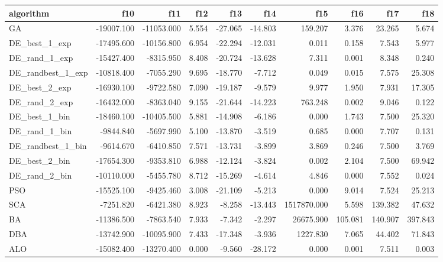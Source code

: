 \documentclass[12pt]{article}
\begin{document}
\begin{table}[H]
\begin{adjustbox}{width=1\textwidth}
    \end{adjustbox}
    
    \begin{adjustbox}{width=1\textwidth}
\begin{tabular}{lrrrrrrrrr}
    \toprule
    algorithm &        f10 &        f11 &   f12 &     f13 &     f14 &         f15 &     f16 &     f17 &     f18 \\
    \midrule
    GA & -19007.100 & -11053.000 & 5.554 & -27.065 & -14.803 &     159.207 &   3.376 &  23.265 &   5.674 \\
    DE\_best\_1\_exp & -17495.600 & -10156.800 & 6.954 & -22.294 & -12.031 &       0.011 &   0.158 &   7.543 &   5.977 \\
    DE\_rand\_1\_exp & -15427.400 &  -8315.950 & 8.408 & -20.724 & -13.628 &       7.311 &   0.001 &   8.348 &   0.240 \\
    DE\_randbest\_1\_exp & -10818.400 &  -7055.290 & 9.695 & -18.770 &  -7.712 &       0.049 &   0.015 &   7.575 &  25.308 \\
    DE\_best\_2\_exp & -16930.100 &  -9722.580 & 7.090 & -19.187 &  -9.579 &       9.977 &   1.950 &   7.931 &  17.305 \\
    DE\_rand\_2\_exp & -16432.000 &  -8363.040 & 9.155 & -21.644 & -14.223 &     763.248 &   0.002 &   9.046 &   0.122 \\
    DE\_best\_1\_bin & -18460.100 & -10405.500 & 5.881 & -14.908 &  -6.186 &       0.000 &   1.743 &   7.500 &  25.320 \\
    DE\_rand\_1\_bin &  -9844.840 &  -5697.990 & 5.100 & -13.870 &  -3.519 &       0.685 &   0.000 &   7.707 &   0.131 \\
    DE\_randbest\_1\_bin &  -9614.670 &  -6410.850 & 7.571 & -13.731 &  -3.899 &       3.869 &   0.246 &   7.500 &   3.769 \\
    DE\_best\_2\_bin & -17654.300 &  -9353.810 & 6.988 & -12.124 &  -3.824 &       0.002 &   2.104 &   7.500 &  69.942 \\
    DE\_rand\_2\_bin & -10110.000 &  -5455.780 & 8.712 & -15.269 &  -4.614 &       4.846 &   0.000 &   7.552 &   0.024 \\
    PSO & -15525.100 &  -9425.460 & 3.008 & -21.109 &  -5.213 &       0.000 &   9.014 &   7.524 &  25.213 \\
    SCA &  -7251.820 &  -6421.380 & 8.923 &  -8.258 & -13.443 & 1517870.000 &   5.598 & 139.382 &  47.632 \\
    BA & -11386.500 &  -7863.540 & 7.933 &  -7.342 &  -2.297 &   26675.900 & 105.081 & 140.907 & 397.843 \\
    DBA & -13742.900 & -10095.900 & 7.433 & -17.348 &  -3.936 &    1227.830 &   7.065 &  44.402 &  71.843 \\
    ALO & -15082.400 & -13270.400 & 0.000 &  -9.560 & -28.172 &       0.000 &   0.001 &   7.511 &   0.003 \\
    \bottomrule
\end{tabular}


\end{adjustbox}
\end{table}
\end{document}
